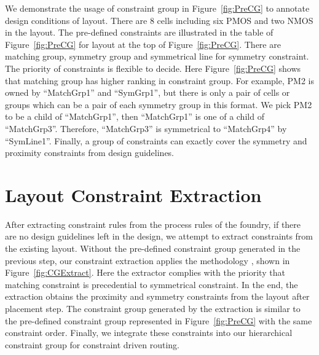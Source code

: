   
    We demonstrate the usage of constraint group in Figure~\ref{fig:PreCG} to annotate design conditions of layout. There are 8 cells including six PMOS and two NMOS in the layout. The pre-defined constraints are illustrated in the table of Figure~\ref{fig:PreCG} for layout at the top of Figure~\ref{fig:PreCG}. There are matching group, symmetry group and symmetrical line for symmetry constraint. The priority of constraints is flexible to decide. Here Figure~\ref{fig:PreCG} shows that matching group has higher ranking in constraint group. For example, PM2 is owned by ``MatchGrp1'' and ``SymGrp1'', but there is only a pair of cells or groups which can be a pair of each symmetry group in this format. We pick PM2 to be a child of  ``MatchGrp1'', then ``MatchGrp1'' is one of a child of ``MatchGrp3''. Therefore, ``MatchGrp3'' is symmetrical to ``MatchGrp4'' by ``SymLine1''. Finally, a group of constraints can exactly cover the symmetry and proximity constraints from design guidelines.


  \section{Layout Constraint Extraction}\label{sec:LayoutConExt}
    After extracting constraint rules from the process rules of the foundry, if there are no design guidelines left in the design, we attempt to extract constraints from the existing layout. Without the pre-defined constraint group generated in the previous step, our constraint extraction applies the methodology \cite{srm-massier-tcad08,palpndg-iccad2011}, shown in Figure~\ref{fig:CGExtract}. Here the extractor complies with the priority that matching constraint is precedential to symmetrical constraint. In the end, the extraction obtains the proximity and symmetry constraints from the layout after placement step. The constraint group generated by the extraction is similar to the pre-defined constraint group represented in Figure~\ref{fig:PreCG} with the same constraint order. Finally, we integrate these constraints into our hierarchical constraint group for constraint driven routing.
  
